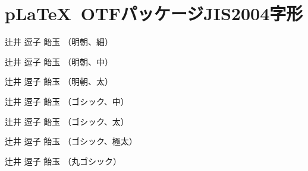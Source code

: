 \documentclass{jsarticle}
\begin{document}
\section{p\LaTeX~OTFパッケージJIS2004字形}

\selectfont
辻井 逗子 飴玉 （明朝、細）

\selectfont
辻井 逗子 飴玉 （明朝、中）

\selectfont
辻井 逗子 飴玉 （明朝、太）

\selectfont
辻井 逗子 飴玉 （ゴシック、中）

\selectfont
辻井 逗子 飴玉 （ゴシック、太）

\selectfont
辻井 逗子 飴玉 （ゴシック、極太）

\selectfont
辻井 逗子 飴玉 （丸ゴシック）
\end{document}
